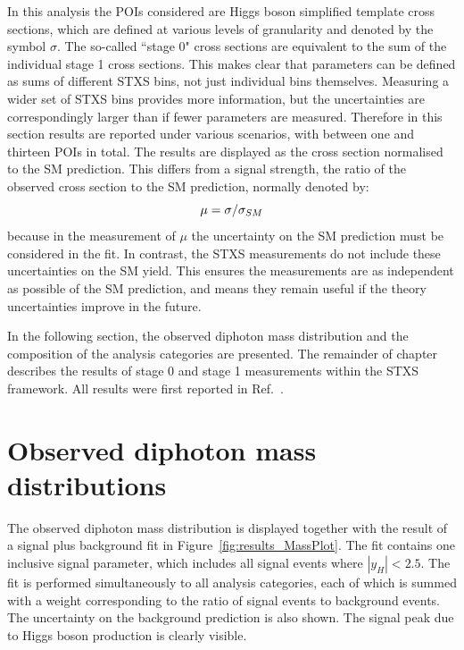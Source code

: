 In this analysis the POIs considered are Higgs boson simplified template cross sections, 
which are defined at various levels of granularity and denoted by the symbol $\sigma$.
The so-called ``stage 0" cross sections are equivalent 
to the sum of the individual stage 1 cross sections.
This makes clear that parameters can be defined as sums of different STXS bins, 
not just individual bins themselves.
Measuring a wider set of STXS bins provides more information, 
but the uncertainties are correspondingly larger than if fewer parameters are measured.
Therefore in this section results are reported under various scenarios, 
with between one and thirteen POIs in total.
The results are displayed as the cross section normalised to the SM prediction. 
This differs from a signal strength, the ratio of the observed cross section 
to the SM prediction, normally denoted by:
\begin{equation}
\mu = \sigma / \sigma_{SM}
\end{equation}
because in the measurement of $\mu$ 
the uncertainty on the SM prediction must be considered in the fit. 
In contrast, the STXS measurements do not include these uncertainties on the SM yield.
This ensures the measurements are as independent as possible of the SM prediction, 
and means they remain useful if the theory uncertainties improve in the future.

In the following section, the observed diphoton mass distribution
and the composition of the analysis categories are presented.
The remainder of chapter describes the results of stage 0 and stage 1 measurements 
within the STXS framework.
All results were first reported in Ref.~\cite{HIG-18-029}.

\section{Observed diphoton mass distributions}

The observed diphoton mass distribution is displayed together with the result 
of a signal plus background fit in Figure~\ref{fig:results_MassPlot}.
The fit contains one inclusive signal parameter, 
which includes all signal events where $|y_H| < 2.5$.
The fit is performed simultaneously to all analysis categories, 
each of which is summed with a weight 
corresponding to the ratio of signal events to background events. %
The uncertainty on the background prediction is also shown.
The signal peak due to Higgs boson production is clearly visible.

